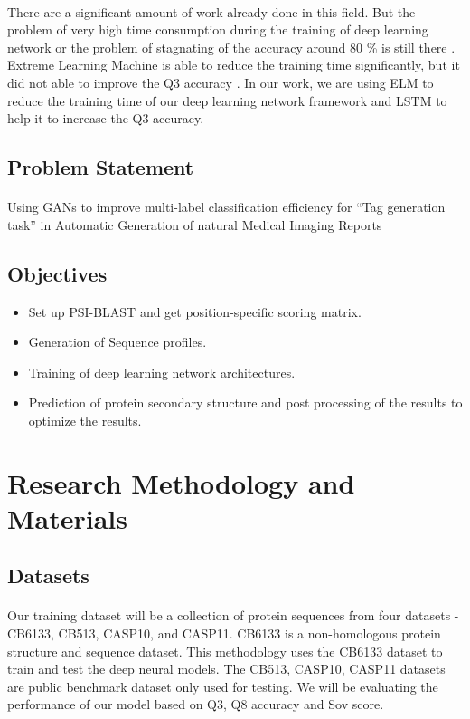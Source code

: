 \documentclass[12pt]{article}
\numberwithin{figure}{section}
\begin{document}
\paragraph{}
There are a significant amount of work already done in this field. But the problem of very high time consumption during the training of deep learning network \cite{3} or the problem of stagnating of the accuracy around 80 \% is still there \cite{6}. Extreme Learning Machine is able to reduce the training time significantly, but it did not able to improve the Q3 accuracy \cite{4}. In our work, we are using ELM to reduce the training time of our deep learning network framework and LSTM to help it to increase the Q3 accuracy.
 \subsection{Problem Statement}
 \paragraph{}
 Using GANs to improve multi-label classification efficiency for “Tag generation task” in Automatic Generation of natural Medical Imaging Reports
\subsection{Objectives}
\begin{itemize}
\item Set up PSI-BLAST and get position-specific scoring matrix.
\item Generation of Sequence profiles.
\item Training of deep learning network architectures.
\item Prediction of protein secondary structure and post processing of the results to optimize the results.
\end{itemize}
\clearpage
\section{Research Methodology and Materials}
\subsection{Datasets}
\paragraph{}
Our training dataset will be a collection of protein sequences from four datasets - CB6133, CB513, CASP10, and CASP11. CB6133 is a non-homologous protein structure and sequence dataset. This methodology uses the CB6133 dataset to train and test the deep neural models. The CB513, CASP10, CASP11 datasets are public benchmark dataset only used for testing. We will be evaluating the performance of our model based on Q3, Q8 accuracy and Sov score.
\end{document}
